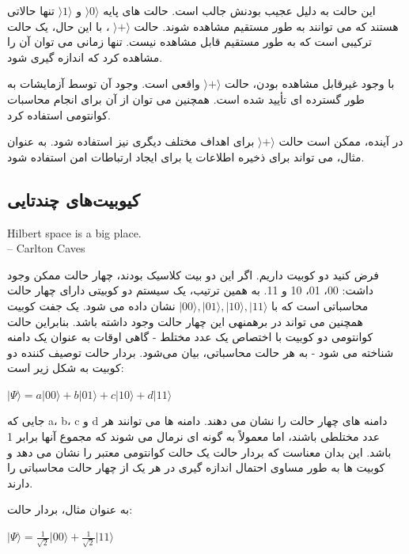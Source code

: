 \documentclass{book}
\begin{document}
این حالت به دلیل عجیب بودنش جالب است. حالت های پایه $\rangle0\rangle$ و $\rangle1\rangle$ تنها حالاتی هستند که می توانند به طور مستقیم مشاهده شوند. حالت $\rangle+\rangle$ ، با این حال، یک حالت ترکیبی است که به طور مستقیم قابل مشاهده نیست. تنها زمانی می توان آن را مشاهده کرد که اندازه گیری شود.

با وجود غیرقابل مشاهده بودن، حالت $\rangle+\rangle$  واقعی است. وجود آن توسط آزمایشات به طور گسترده ای تأیید شده است. همچنین می توان از آن برای انجام محاسبات کوانتومی استفاده کرد.

در آینده، ممکن است حالت $\rangle+\rangle$  برای اهداف مختلف دیگری نیز استفاده شود. به عنوان مثال، می تواند برای ذخیره اطلاعات یا برای ایجاد ارتباطات امن استفاده شود.

\subsection{کیوبیت‌های چندتایی}

\begin{latin}
	Hilbert space is a big place.\\
	\hspace{2cm}– Carlton Caves
\end{latin}




فرض کنید دو کوبیت داریم. اگر این دو بیت کلاسیک بودند، چهار حالت ممکن وجود داشت: 00، 01، 10 و 11. به همین ترتیب، یک سیستم دو کوبیتی دارای چهار حالت محاسباتی است که با $\vert 00 \rangle, \vert 01 \rangle, \vert 10 \rangle, \vert 11 \rangle$ نشان داده می شود. یک جفت کوبیت همچنین می تواند در برهمنهی این چهار حالت وجود داشته باشد.
بنابراین حالت کوانتومی دو کوبیت با اختصاص یک عدد مختلط - گاهی اوقات به عنوان یک دامنه شناخته می شود - به هر حالت محاسباتی، بیان می‌شود. بردار حالت توصیف کننده دو کوبیت به شکل زیر است:
\begin{center}
	$\vert \Psi \rangle = a \vert00\rangle + b \vert01\rangle + c \vert10\rangle + d \vert11\rangle $
\end{center}

جایی که a، b، c و d دامنه های چهار حالت را نشان می دهند. دامنه ها می توانند هر عدد مختلطی باشند، اما معمولاً به گونه ای نرمال می شوند که مجموع آنها برابر 1 باشد. این بدان معناست که بردار حالت یک حالت کوانتومی معتبر را نشان می دهد و کوبیت ها به طور مساوی احتمال اندازه گیری در هر یک از چهار حالت محاسباتی را دارند.

به عنوان مثال، بردار حالت:

\begin{center}
$\vert \Psi \rangle = \frac{1}{\sqrt{2}} \vert00\rangle + \frac{1}{\sqrt{2}} \vert11\rangle$	
\end{center}
\end{document}
